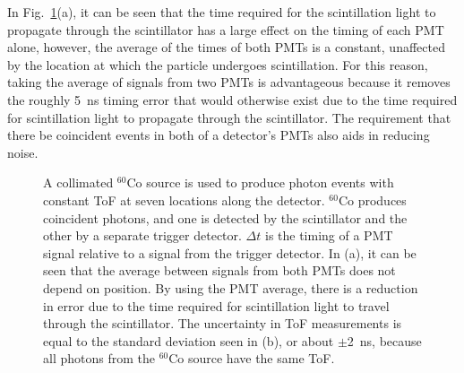 In Fig.~\ref{fig:ConstPMTAvg}(a), it can be seen that the time required for the scintillation light to propagate through the scintillator has a large effect on the timing of each PMT alone, however, the average of the times of both PMTs is a constant, unaffected by the location at which the particle undergoes scintillation.
For this reason, taking the average of signals from two PMTs is advantageous because it removes the roughly 5~ns timing error that would otherwise exist due to the time required for scintillation light to propagate through the scintillator.
The requirement that there be coincident events in both of a detector's PMTs also aids in reducing noise.
\begin{figure}[h]
\centering
{}

\caption{A collimated $^{60}$Co source is used to produce photon events with constant ToF at seven locations along the detector.
$^{60}$Co produces coincident photons, and one is detected by the scintillator and the other by a separate trigger detector.
 $\Delta t$ is the timing of a PMT signal relative to a signal from the trigger detector. 
 In (a), it can be seen that the average between signals from both PMTs does not depend on position.
By using the PMT average, there is a reduction in error due to the time required for scintillation light to travel through the scintillator.
The uncertainty in ToF measurements is equal to the standard deviation seen in (b), or about $\pm$2~ns, because all photons from the $^{60}$Co source have the same ToF.}
\label{fig:ConstPMTAvg}
\end{figure}

